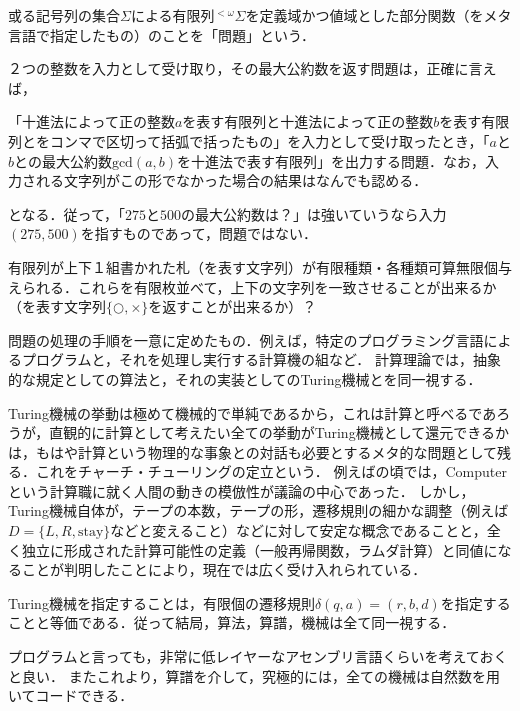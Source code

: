 \documentclass[uplatex, 12pt, dvipdfmx]{jsreport}
\begin{document}
\begin{definition}[問題]
    或る記号列の集合$\Sigma$による有限列${}^{<\omega}\Sigma$を定義域かつ値域とした部分関数（をメタ言語で指定したもの）のことを「問題」という．
\end{definition}
\begin{example}
    ２つの整数を入力として受け取り，その最大公約数を返す問題は，正確に言えば，
    \begin{center}
        「十進法によって正の整数$a$を表す有限列と十進法によって正の整数$b$を表す有限列とをコンマで区切って括弧で括ったもの」を入力として受け取ったとき，「$a$と$b$との最大公約数$\mathrm{gcd}(a,b)$を十進法で表す有限列」を出力する問題．なお，入力される文字列がこの形でなかった場合の結果はなんでも認める．
    \end{center}
    となる．従って，「$275$と$500$の最大公約数は？」は強いていうなら入力$(275,500)$を指すものであって，問題ではない．
\end{example}
\begin{example}\label{problem-PCP}
    有限列が上下１組書かれた札（を表す文字列）が有限種類・各種類可算無限個与えられる．これらを有限枚並べて，上下の文字列を一致させることが出来るか（を表す文字列$\{\bigcirc,\times\}$を返すことが出来るか）？
\end{example}

\begin{definition}[算法]
    問題の処理の手順を一意に定めたもの．例えば，特定のプログラミング言語によるプログラムと，それを処理し実行する計算機の組など．
    計算理論では，抽象的な規定としての算法と，それの実装としてのTuring機械とを同一視する．
\end{definition}
\begin{remark}
    Turing機械の挙動は極めて機械的で単純であるから，これは計算と呼べるであろうが，直観的に計算として考えたい全ての挙動がTuring機械として還元できるかは，もはや計算という物理的な事象との対話も必要とするメタ的な問題として残る．これをチャーチ・チューリングの定立という．
    例えば\cite{Turing-OnComputableNumbers}の頃では，Computerという計算職に就く人間の動きの模倣性が議論の中心であった．
    しかし，Turing機械自体が，テープの本数，テープの形，遷移規則の細かな調整（例えば$D=\{L,R,\mathrm{stay}\}$などと変えること）などに対して安定な概念であることと，全く独立に形成された計算可能性の定義（一般再帰関数，ラムダ計算）と同値になることが判明したことにより，現在では広く受け入れられている．
\end{remark}
\begin{definition}[算譜]
    Turing機械を指定することは，有限個の遷移規則$\delta(q,a)=(r,b,d)$を指定することと等価である．従って結局，算法，算譜，機械は全て同一視する．
\end{definition}
\begin{remark}
    プログラムと言っても，非常に低レイヤーなアセンブリ言語くらいを考えておくと良い．
    またこれより，算譜を介して，究極的には，全ての機械は自然数を用いてコードできる．
\end{remark}
\end{document}
